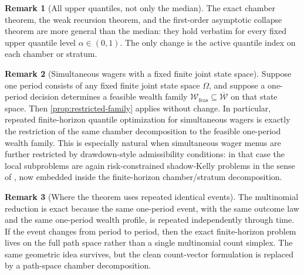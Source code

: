 \documentclass[11pt]{article}
\theoremstyle{definition}
\newtheorem{remark}[remark]{Remark}
\newcommand{\1}{\mathbf{1}}
\begin{document}
\begin{remark}[All upper quantiles, not only the median]
The exact chamber theorem, the weak recursion theorem, and the first-order asymptotic collapse theorem are more general than the median: they hold verbatim for every fixed upper quantile level $\alpha\in(0,1)$. The only change is the active quantile index on each chamber or stratum.
\end{remark}

\begin{remark}[Simultaneous wagers with a fixed finite joint state space]
Suppose one period consists of any fixed finite joint state space $\Omega$, and suppose a one-period decision determines a feasible wealth family $\mathcal W_{\mathrm{feas}}\subseteq\overline{\mathcal W}$ on that state space. Then \cref{prop:restricted-family} applies without change. In particular, repeated finite-horizon quantile optimization for simultaneous wagers is exactly the restriction of the same chamber decomposition to the feasible one-period wealth family. This is especially natural when simultaneous wager menus are further restricted by drawdown-style admissibility conditions: in that case the local subproblems are again risk-constrained shadow-Kelly problems in the sense of \cite{Long2026Risk}, now embedded inside the finite-horizon chamber/stratum decomposition.
\end{remark}

\begin{remark}[Where the theorem uses repeated identical events]
The multinomial reduction is exact because the same one-period event, with the same outcome law and the same one-period wealth profile, is repeated independently through time. If the event changes from period to period, then the exact finite-horizon problem lives on the full path space rather than a single multinomial count simplex. The same geometric idea survives, but the clean count-vector formulation is replaced by a path-space chamber decomposition.
\end{remark}
\end{document}
